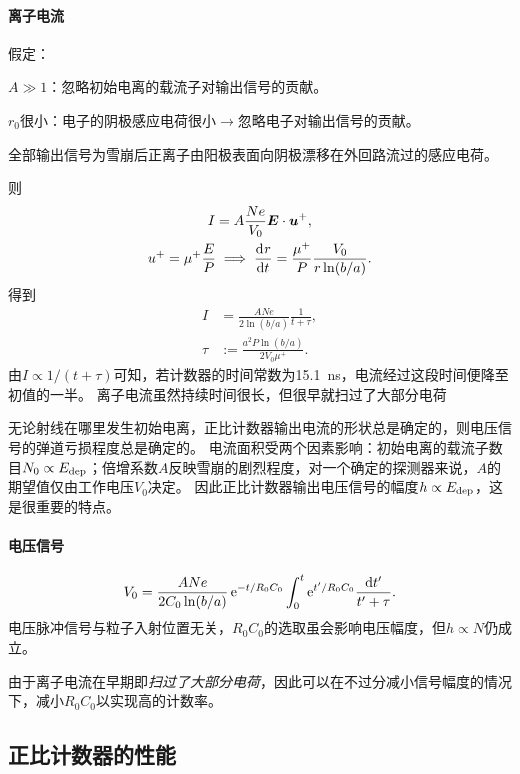 \paragraph{离子电流}假定：
\begin{compactenum}
	\item $A \gg 1$：忽略初始电离的载流子对输出信号的贡献。
	\item $r_0$很小：电子的阴极感应电荷很小$\to$忽略电子对输出信号的贡献。
	\item 全部输出信号为雪崩后正离子由阳极表面向阴极漂移在外回路流过的感应电荷。
\end{compactenum}
则
\begin{gather*}
	I = A\frac{Ne}{V_0}\bm E \cdot \bm u^+,\\
	u^+ = \mu^+\frac EP \implies \frac{\mathop{}\!\mathrm{d}^{}r}{\mathrm{d}{t}^{}} = \frac{\mu^+}P\frac{V_0}{r\ln(b/a)}.
\end{gather*}
得到
\begin{subequations}\label{eq:nrd-proportional-counter-pulse}
	\begin{align}
		I &= \frac{ANe}{2\ln(b/a)}\frac1{t + \tau},\\
		\tau &:= \frac{a^2P\ln(b/a)}{2V_0\mu^+}.
	\end{align}
\end{subequations}
由$I \propto 1/(t + \tau)$可知，若计数器的时间常数为\qty{15.1}{ns}，电流经过这段时间便降至初值的一半。
离子电流虽然持续时间很长，但很早就扫过了大部分电荷

无论射线在哪里发生初始电离，正比计数器输出电流的形状总是确定的，则电压信号的弹道亏损程度总是确定的。
电流面积受两个因素影响：初始电离的载流子数目$N_0 \propto E_{\mathrm{dep}}$；倍增系数$A$反映雪崩的剧烈程度，对一个确定的探测器来说，$A$的期望值仅由工作电压$V_0$决定。
因此正比计数器输出电压信号的幅度$h \propto E_{\mathrm{dep}}$，这是很重要的特点。
\paragraph{电压信号}
\[
	V_0 = \frac{ANe}{2C_0\ln(b/a)}\mathop{}\!\mathrm{e}^{-t/R_0C_0}\int_0^t\mathop{}\!\mathrm{e}^{t'/R_0C_0}\frac{\mathop{}\!\mathrm{d} t'}{t' + \tau}.
\]
电压脉冲信号与粒子入射位置无关，$R_0C_0$的选取虽会影响电压幅度，但$h \propto N$仍成立。

由于离子电流在早期即\textit{扫过了大部分电荷}，因此可以在不过分减小信号幅度的情况下，减小$R_0C_0$以实现高的计数率。

\subsection{正比计数器的性能}

